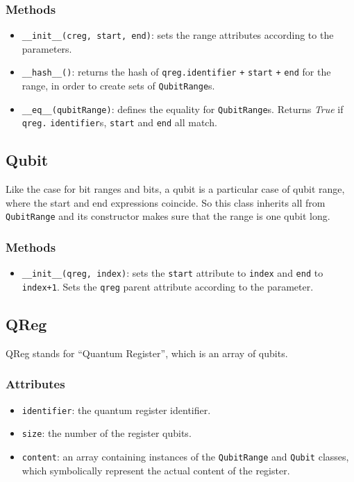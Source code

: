 \documentclass[12pt,a4paper]{report}
\theoremstyle{definition}
\theoremstyle{definition}
\theoremstyle{definition}
\begin{document}
\subsubsection{Methods}
\begin{itemize}
    \itemsep 0em
    \item \texttt{\_\_init\_\_(creg, start, end)}: sets the range attributes according to the parameters.
    \item \texttt{\_\_hash\_\_()}: returns the hash of \texttt{qreg.identifier} \texttt{+} \texttt{start} \texttt{+} \texttt{end} for the range, in order to create sets of \texttt{QubitRange}s.
    \item \texttt{\_\_eq\_\_(qubitRange)}: defines the equality for \texttt{QubitRange}s. Returns \textit{True} if \texttt{qreg.} \texttt{identifier}s, \texttt{start} and \texttt{end} all match.
\end{itemize}

\subsection{Qubit}
Like the case for bit ranges and bits, a qubit is a particular case of qubit range, where the start and end expressions coincide. So this class inherits all from \texttt{QubitRange} and its constructor makes sure that the range is one qubit long.
\subsubsection{Methods}
\begin{itemize}
    \itemsep 0em
    \item \texttt{\_\_init\_\_(qreg, index)}: sets the \texttt{start} attribute to \texttt{index} and \texttt{end} to \texttt{index+1}. Sets the \texttt{qreg} parent attribute according to the parameter.
\end{itemize}


\subsection{QReg}
QReg stands for ``Quantum Register'', which is an array of qubits.
\subsubsection{Attributes}
\begin{itemize}
    \itemsep 0em
    \item \texttt{identifier}: the quantum register identifier.
    \item \texttt{size}: the number of the register qubits.
    \item \texttt{content}: an array containing instances of the \texttt{QubitRange} and \texttt{Qubit} classes, which symbolically represent the actual content of the register.
\end{itemize}
\end{document}
